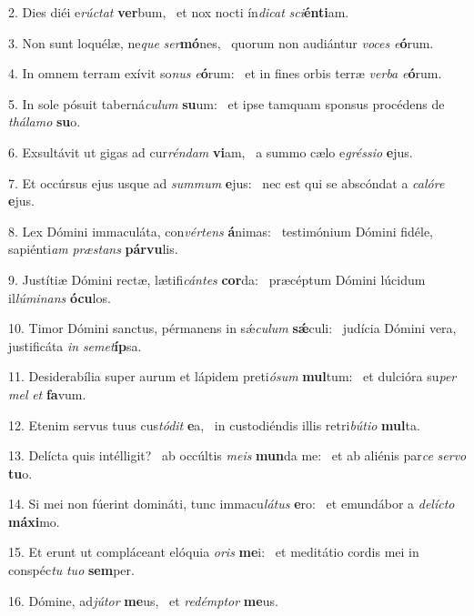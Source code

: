 2. Dies diéi e\textit{rúc}\textit{tat} \textbf{ver}bum, \ast\  et nox nocti ín\textit{di}\textit{cat} \textit{sci}\textbf{én}\textbf{ti}am.\

3. Non sunt loquélæ, ne\textit{que} \textit{ser}\textbf{mó}nes, \ast\  quorum non audiántur \textit{vo}\textit{ces} \textit{e}\textbf{ó}rum.\

4. In omnem terram exívit so\textit{nus} \textit{e}\textbf{ó}rum: \ast\  et in fines orbis terræ \textit{ver}\textit{ba} \textit{e}\textbf{ó}rum.\

5. In sole pósuit taberná\textit{cu}\textit{lum} \textbf{su}um: \ast\  et ipse tamquam sponsus procédens de \textit{thá}\textit{la}\textit{mo} \textbf{su}o.\

6. Exsultávit ut gigas ad cur\textit{rén}\textit{dam} \textbf{vi}am, \ast\  a summo cælo e\textit{grés}\textit{si}\textit{o} \textbf{e}jus.\

7. Et occúrsus ejus usque ad \textit{sum}\textit{mum} \textbf{e}jus: \ast\  nec est qui se abscóndat a \textit{ca}\textit{ló}\textit{re} \textbf{e}jus.\

8. Lex Dómini immaculáta, con\textit{vér}\textit{tens} \textbf{á}nimas: \ast\  testimónium Dómini fidéle, sapiénti\textit{am} \textit{præ}\textit{stans} \textbf{pár}\textbf{vu}lis.\

9. Justítiæ Dómini rectæ, lætifi\textit{cán}\textit{tes} \textbf{cor}da: \ast\  præcéptum Dómini lúcidum il\textit{lú}\textit{mi}\textit{nans} \textbf{ó}\textbf{cu}los.\

10. Timor Dómini sanctus, pérmanens in sǽ\textit{cu}\textit{lum} \textbf{sǽ}culi: \ast\  judícia Dómini vera, justificáta \textit{in} \textit{se}\textit{met}\textbf{íp}sa.\

11. Desiderabília super aurum et lápidem preti\textit{ó}\textit{sum} \textbf{mul}tum: \ast\  et dulcióra su\textit{per} \textit{mel} \textit{et} \textbf{fa}vum.\

12. Etenim servus tuus cus\textit{tó}\textit{dit} \textbf{e}a, \ast\  in custodiéndis illis retri\textit{bú}\textit{ti}\textit{o} \textbf{mul}ta.\

13. Delícta quis intélligit? \dag\  ab occúltis \textit{me}\textit{is} \textbf{mun}da me: \ast\  et ab aliénis par\textit{ce} \textit{ser}\textit{vo} \textbf{tu}o.\

14. Si mei non fúerint domináti, tunc immacu\textit{lá}\textit{tus} \textbf{e}ro: \ast\  et emundábor a \textit{de}\textit{líc}\textit{to} \textbf{má}\textbf{xi}mo.\

15. Et erunt ut compláceant elóquia \textit{o}\textit{ris} \textbf{me}i: \ast\  et meditátio cordis mei in conspéc\textit{tu} \textit{tu}\textit{o} \textbf{sem}per.\

16. Dómine, ad\textit{jú}\textit{tor} \textbf{me}us, \ast\  et \textit{red}\textit{émp}\textit{tor} \textbf{me}us.\

